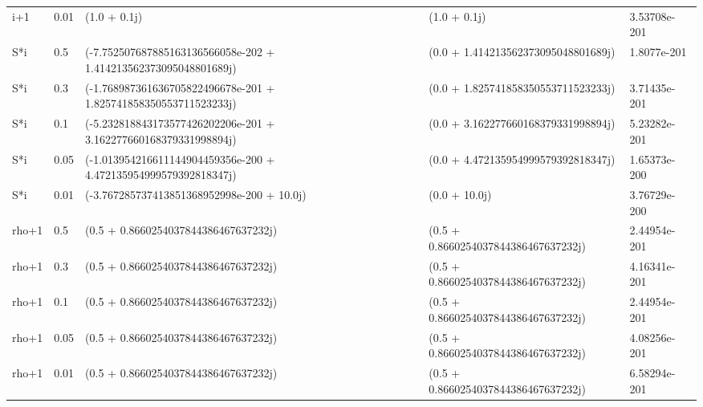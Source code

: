 \documentclass[10pt]{article}
\begin{document}
{\begin{longtable}{@{}lllll@{}}
i+1 & 0.01 & (1.0 + 0.1j) & (1.0 + 0.1j) & 3.53708e-201 \\
S*i & 0.5 & (-7.752507687885163136566058e-202 + 1.414213562373095048801689j) & (0.0 + 1.414213562373095048801689j) & 1.8077e-201 \\
S*i & 0.3 & (-1.768987361636705822496678e-201 + 1.825741858350553711523233j) & (0.0 + 1.825741858350553711523233j) & 3.71435e-201 \\
S*i & 0.1 & (-5.232818843173577426202206e-201 + 3.162277660168379331998894j) & (0.0 + 3.162277660168379331998894j) & 5.23282e-201 \\
S*i & 0.05 & (-1.013954216611144904459356e-200 + 4.472135954999579392818347j) & (0.0 + 4.472135954999579392818347j) & 1.65373e-200 \\
S*i & 0.01 & (-3.767285737413851368952998e-200 + 10.0j) & (0.0 + 10.0j) & 3.76729e-200 \\
rho+1 & 0.5 & (0.5 + 0.8660254037844386467637232j) & (0.5 + 0.8660254037844386467637232j) & 2.44954e-201 \\
rho+1 & 0.3 & (0.5 + 0.8660254037844386467637232j) & (0.5 + 0.8660254037844386467637232j) & 4.16341e-201 \\
rho+1 & 0.1 & (0.5 + 0.8660254037844386467637232j) & (0.5 + 0.8660254037844386467637232j) & 2.44954e-201 \\
rho+1 & 0.05 & (0.5 + 0.8660254037844386467637232j) & (0.5 + 0.8660254037844386467637232j) & 4.08256e-201 \\
rho+1 & 0.01 & (0.5 + 0.8660254037844386467637232j) & (0.5 + 0.8660254037844386467637232j) & 6.58294e-201 \\
\bottomrule
\end{longtable}}
\end{document}
